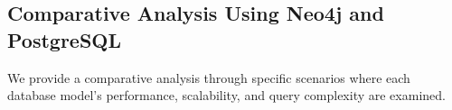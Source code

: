 \subsection{Comparative Analysis Using Neo4j and PostgreSQL}
We provide a comparative analysis through specific scenarios where each database model's performance, scalability, and query complexity are examined.
